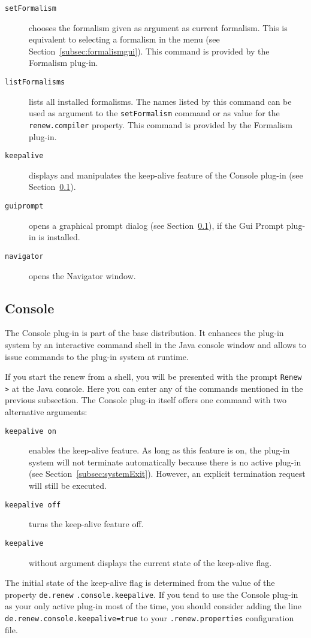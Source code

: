\begin{description}
\item[\texttt{setFormalism}]
  chooses the formalism given as argument as current formalism.
  This is equivalent to selecting a formalism in the menu (see 
  Section~\ref{subsec:formalismgui}).
  This command is provided by the Formalism plug-in.
\item[\texttt{listFormalisms}]
  lists all installed formalisms.
  The names listed by this command can be used as argument to the
  \texttt{setFormalism} command or as value for the
  \texttt{renew.compiler} property.
  This command is provided by the Formalism plug-in.
\item[\texttt{keepalive}]
  displays and manipulates the keep-alive feature of the Console
  plug-in (see Section~\ref{subsec:consolePlugin}).
\item[\texttt{guiprompt}] 
  opens a graphical prompt dialog (see Section~\ref{subsec:consolePlugin}),
  if the Gui Prompt plug-in is installed.
\item[\texttt{navigator}]
 opens the Navigator window.  
\end{description}

\subsection{Console}
\label{subsec:consolePlugin}

The Console plug-in is part of the base distribution.
It enhances the plug-in system by an interactive command shell in
the Java console window and allows to
issue commands to the plug-in system at runtime.


If you start the renew from a shell, you will be presented
with the prompt \texttt{Renew >} at the Java console.
Here you can enter any of the commands mentioned in the previous
subsection.
The Console plug-in itself offers one command with two alternative
arguments:
\begin{description}
\item[\texttt{keepalive on}]
  enables the keep-alive feature.
  As long as this feature is on, the plug-in system will not
  terminate automatically because there is no active plug-in (see
  Section~\ref{subsec:systemExit}).
  However, an explicit termination request will still be
  executed.
\item[\texttt{keepalive off}]
  turns the keep-alive feature off.
\item[\texttt{keepalive}]
  without argument displays the current state of the keep-alive
  flag.
\end{description}
The initial state of the keep-alive flag is determined from the
value of the property \texttt{de.renew} \texttt{.console.keepalive}.
If you tend to use the Console plug-in as your only active plug-in most of
the time, you should consider adding the line
\texttt{de.renew.console.keepalive=true} to your
\texttt{.renew.properties} configuration file. 

